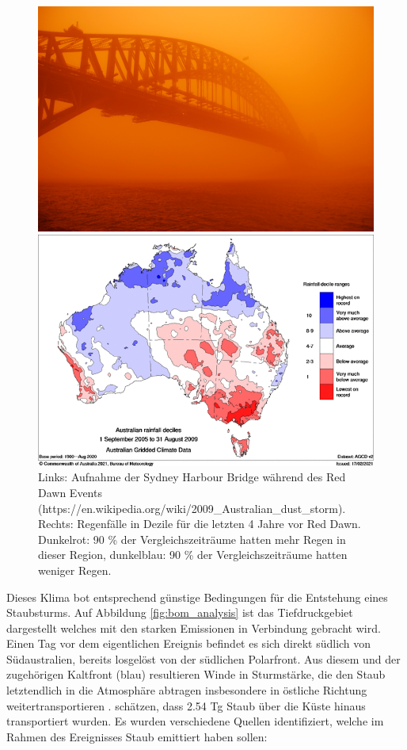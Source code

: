 \documentclass[12pt,a4paper,onecolumn]{scrartcl}
\begin{document}
\begin{figure}[ht]
	\begin{minipage}[c]{0.5\textwidth}
		\includegraphics[width=\textwidth]{bilder/reddawn/SHB.jpg}
	\end{minipage}\hfill
	\begin{minipage}[c]{0.49\textwidth}
		\includegraphics[width=\textwidth]{bilder/reddawn/drought.png}
	\end{minipage}\hfill
	\caption{Links: Aufnahme der Sydney Harbour Bridge während des Red Dawn Events (https://en.wikipedia.org/wiki/2009_Australian_dust_storm). Rechts: Regenfälle in Dezile für die letzten 4 Jahre vor Red Dawn. Dunkelrot: 90 \% der Vergleichszeiträume hatten mehr Regen in dieser Region, dunkelblau: 90 \% der Vergleichszeiträume hatten weniger Regen.} \label{fig:reddawn}
\end{figure}
Dieses Klima bot entsprechend günstige Bedingungen für die Entstehung eines Staubsturms. Auf Abbildung \ref{fig:bom_analysis} ist das Tiefdruckgebiet dargestellt welches mit den starken Emissionen in Verbindung gebracht wird. Einen Tag vor dem eigentlichen Ereignis befindet es sich direkt südlich von Südaustralien, bereits losgelöst von der südlichen Polarfront. Aus diesem und der zugehörigen Kaltfront (blau) resultieren Winde in Sturmstärke, die den Staub letztendlich in die Atmosphäre abtragen insbesondere in östliche Richtung weitertransportieren \citep{Leys.2011}.\citet{Leys.2011} schätzen, dass 2.54 Tg Staub über die Küste hinaus transportiert wurden.  Es wurden verschiedene Quellen identifiziert, welche im Rahmen des Ereignisses Staub emittiert haben sollen:
\end{document}
